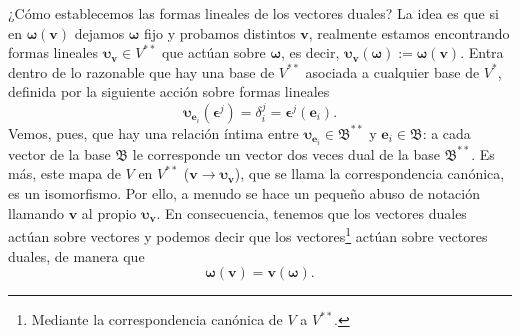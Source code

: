 ¿Cómo establecemos las formas lineales de los vectores duales? La idea es que si en \(\boldsymbol{\omega}(\mathbf{v})\) dejamos \(\boldsymbol{\omega}\) fijo y probamos distintos \(\mathbf{v}\), realmente estamos encontrando formas lineales \(\boldsymbol{\upsilon}_\mathbf{v}\in V^{**}\) que actúan sobre \(\boldsymbol{\omega}\), es decir, \(\boldsymbol{\upsilon}_\mathbf{v}(\boldsymbol{\omega}):=\boldsymbol{\omega}(\mathbf{v})\). Entra dentro de lo razonable que hay una base de \(V^{**}\) asociada a cualquier base de \(V^*\), definida por la siguiente acción sobre formas lineales
\begin{equation}
    \boldsymbol{\upsilon}_{\mathbf{e}_i}(\boldsymbol{\epsilon}^j) = \delta_{i}^j = \boldsymbol{\epsilon}^j(\mathbf{e}_i).
\end{equation}
Vemos, pues, que hay una relación íntima entre \(\boldsymbol{\upsilon}_{\mathbf{e}_i}\in\mathfrak{B}^{**}\) y \(\mathbf{e}_i\in \mathfrak{B}\): a cada vector de la base \(\mathfrak{B}\) le corresponde un vector dos veces dual de la base \(\mathfrak{B}^{**}\). Es más, este mapa de \(V\) en \(V^{**}\) (\(\mathbf{v}\rightarrow\boldsymbol{\upsilon}_\mathbf{v}\)), que se llama la correspondencia canónica, es un isomorfismo. Por ello, a menudo se hace un pequeño abuso de notación llamando \(\mathbf{v}\) al propio \(\boldsymbol{\upsilon}_\mathbf{v}\). En consecuencia, tenemos que los vectores duales actúan sobre vectores y podemos decir que los vectores\footnote{Mediante la correspondencia canónica de \(V\) a \(V^{**}\).} actúan sobre vectores duales, de manera que
\begin{equation}
    \boldsymbol{\omega}(\mathbf{v}) = \mathbf{v}(\boldsymbol{\omega}).
\end{equation}

